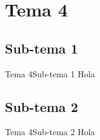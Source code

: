 \section{Tema 4}

\subsection{Sub-tema 1}
\begin{frame}{Tema 4}{Sub-tema 1}
  Hola
\end{frame}


\subsection{Sub-tema 2}
\begin{frame}{Tema 4}{Sub-tema 2}
  Hola
\end{frame}

